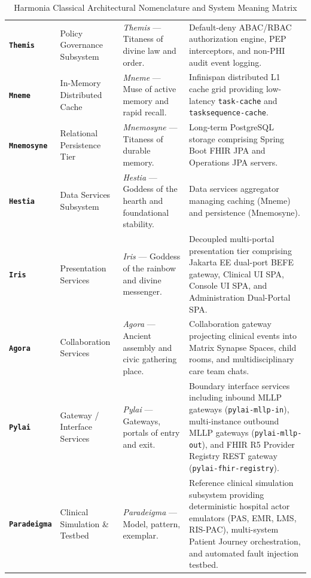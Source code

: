 \begin{table}[htbp]
\begin{tabularx}{\textwidth}{l p{3.2cm} p{3.5cm} X}
\textbf{\texttt{Themis}} & Policy Governance Subsystem & \textit{Themis} --- Titaness of divine law and order. & Default-deny ABAC/RBAC authorization engine, PEP interceptors, and non-PHI audit event logging. \\
\addlinespace
\textbf{\texttt{Mneme}} & In-Memory Distributed Cache & \textit{Mneme} --- Muse of active memory and rapid recall. & Infinispan distributed L1 cache grid providing low-latency \texttt{task-cache} and \texttt{tasksequence-cache}. \\
\addlinespace
\textbf{\texttt{Mnemosyne}} & Relational Persistence Tier & \textit{Mnemosyne} --- Titaness of durable memory. & Long-term PostgreSQL storage comprising Spring Boot FHIR JPA and Operations JPA servers. \\
\addlinespace
\textbf{\texttt{Hestia}} & Data Services Subsystem & \textit{Hestia} --- Goddess of the hearth and foundational stability. & Data services aggregator managing caching (Mneme) and persistence (Mnemosyne). \\
\addlinespace
\textbf{\texttt{Iris}} & Presentation Services & \textit{Iris} --- Goddess of the rainbow and divine messenger. & Decoupled multi-portal presentation tier comprising Jakarta EE dual-port BEFE gateway, Clinical UI SPA, Console UI SPA, and Administration Dual-Portal SPA. \\
\addlinespace
\textbf{\texttt{Agora}} & Collaboration Services & \textit{Agora} --- Ancient assembly and civic gathering place. & Collaboration gateway projecting clinical events into Matrix Synapse Spaces, child rooms, and multidisciplinary care team chats. \\
\addlinespace
\textbf{\texttt{Pylai}} & Gateway / Interface Services & \textit{Pylai} --- Gateways, portals of entry and exit. & Boundary interface services including inbound MLLP gateways (\texttt{pylai-mllp-in}), multi-instance outbound MLLP gateways (\texttt{pylai-mllp-out}), and FHIR R5 Provider Registry REST gateway (\texttt{pylai-fhir-registry}). \\
\addlinespace
\textbf{\texttt{Paradeigma}} & Clinical Simulation \& Testbed & \textit{Paradeigma} --- Model, pattern, exemplar. & Reference clinical simulation subsystem providing deterministic hospital actor emulators (PAS, EMR, LMS, RIS-PAC), multi-system Patient Journey orchestration, and automated fault injection testbed. \\
\bottomrule
\end{tabularx}
\caption{Harmonia Classical Architectural Nomenclature and System Meaning Matrix}
\label{tab:system_nomenclature}
\end{table}

\newpage
